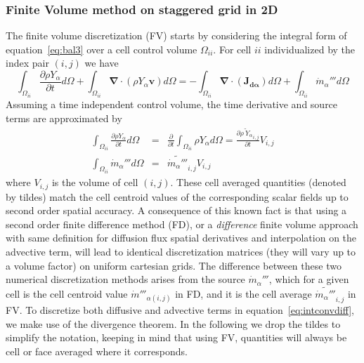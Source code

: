 \documentclass[12pt]{article}
\begin{document}
\subsubsection{Finite Volume method on staggered grid in 2D}

The finite volume discretization (FV) starts by considering the integral form of equation~\eqref{eq:bal3} over a cell control volume $\Omega_{ii}$. For
cell $ii$ individualized by the index pair $(i,j)$ we have
%
\begin{equation}
 \int_{\Omega_{ii}} {\frac{\partial \rho Y_\alpha}{\partial t}} d \Omega + \int_{\Omega_{ii}} { \boldsymbol{\nabla} \cdot  \left(  \rho Y_\alpha \mathbf{v} \right)
      } d \Omega  = -\int_{\Omega_{ii}} { \boldsymbol{\nabla} \cdot \left(  \mathbf{J_{d \alpha}}  \right)  } d \Omega + \int_{\Omega_{ii}} { \dot{m}_\alpha''' } d \Omega \label{eq:intconvdiff}
\end{equation}
%
Assuming a time independent control volume, the time derivative and source terms are approximated by
%
\begin{eqnarray}
  \int_{\Omega_{ii}} {\frac{\partial \rho Y_\alpha}{\partial t}} d \Omega & = & \frac{\partial}{\partial t} \int_{\Omega_{ii}} {\rho Y_\alpha} d \Omega
  = \frac{\partial \widetilde{\rho \: Y_\alpha }_{i,j}}{\partial t} V_{i,j} \\
  \int_{\Omega_{ii}} { \dot{m}_\alpha''' } d \Omega & = & \widetilde{ \dot{m}_\alpha''' }_{i,j} V_{i,j} \label{eq:intcons}
\end{eqnarray}
%
where $V_{i,j}$ is the volume of cell $(i,j)$. These cell averaged quantities (denoted by tildes) match the cell centroid values of the corresponding scalar fields up to second order spatial accuracy. A consequence of this known fact is that using a second order finite difference method (FD), or a \textit{difference} finite volume approach with same definition
 for diffusion flux spatial derivatives and interpolation on the advective term, will lead to identical discretization matrices (they will vary up to a volume factor) on uniform cartesian grids. The difference between these two numerical discretization methods arises from the source $\dot{m}_\alpha''' $, which for a given cell is the cell centroid value $\dot{m}'''_{\alpha (i,j)}$ in FD, and it is the cell average $ \widetilde{ \dot{m}_\alpha''' }_{i,j}$ in FV. To discretize both diffusive and advective terms in equation~\eqref{eq:intconvdiff}, we make use of the divergence theorem. In the following we drop the tildes to simplify the notation, keeping in mind that using FV, quantities will always be cell or face averaged where it corresponds.
\end{document}
